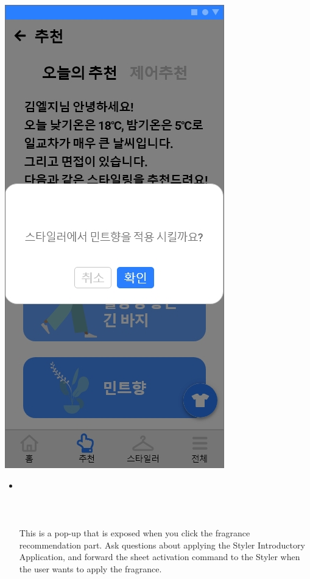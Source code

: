 \documentclass[conference]{IEEEtran}
\begin{document}
\begin{enumerate}
{                \includegraphics[scale=0.25]{추천5.jpg}}
    \begin{itemize}
    \item[] \\ \\ \\ \\ This is a pop-up that is exposed when you click the fragrance recommendation part. Ask questions about applying the Styler Introductory Application, and forward the sheet activation command to the Styler when the user wants to apply the fragrance.\\
\end{itemize}
\end{enumerate}
\end{document}

